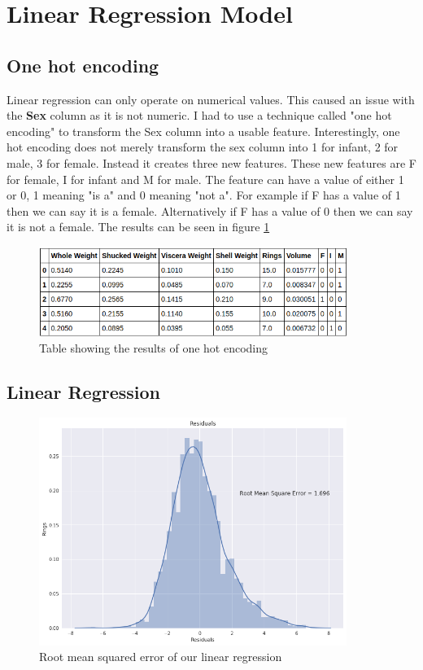 \section{Linear Regression Model}

\subsection{One hot encoding}

Linear regression can only operate on numerical values. This caused an issue with the \textbf{Sex} column as it is not numeric. I had to use a technique called "one hot encoding" to transform the Sex column into a usable feature. Interestingly, one hot encoding does not merely transform the sex column into 1 for infant, 2 for male, 3 for female. Instead it creates three new features. These new features are F for female, I for infant and M for male. The feature can have a value of either 1 or 0, 1 meaning "is a" and 0 meaning "not a". For example if F has a value of 1 then we can say it is a female. Alternatively if F has a value of 0 then we can say it is not a female. The results can be seen in figure \ref{fig:abalone-one-hot-encoding}
\begin{figure}[H]
  \centering
  \includegraphics[scale=0.5,width=100mm]{./images/abalone-one-hot-encoding.png}
  \caption{Table showing the results of one hot encoding}
  \label{fig:abalone-one-hot-encoding}
\end{figure}

\subsection{Linear Regression}

\begin{figure}[H]
  \centering
  \includegraphics[scale=0.5,width=100mm]{./images/abalone-linear-regression-hist.png}
  \caption{Root mean squared error of  our linear regression}
  \label{fig:abalone-linear-rmse}
\end{figure}

